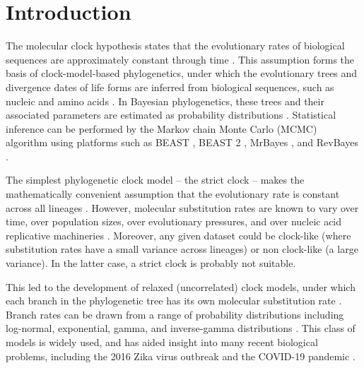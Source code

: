 \documentclass[10pt,letterpaper]{article}
\begin{document}
\linenumbers

\clearpage
\section*{Introduction}


The molecular clock hypothesis states that the evolutionary rates of biological sequences are approximately constant through time \cite{zuckerkandl1962molecular}.
This assumption forms the basis of clock-model-based phylogenetics, under which the evolutionary trees and divergence dates of life forms are inferred from biological sequences, such as nucleic and amino acids \cite{douzery2003local, drummond2006relaxed}.
In Bayesian phylogenetics, these trees and their associated parameters are estimated as probability distributions \cite{kuhner1995estimating, larget1999markov, mau1999bayesian}. 
Statistical inference can be performed by the Markov chain Monte Carlo (MCMC) algorithm \cite{metropolis53, hastings70} using platforms such as BEAST \cite{drummond2012bayesian}, BEAST 2 \cite{bouckaert2019beast}, MrBayes \cite{ronquist2012mrbayes}, and RevBayes \cite{hohna2016revbayes}.



The simplest phylogenetic clock model -- the strict clock -- makes the mathematically convenient assumption that the evolutionary rate is constant across all lineages \cite{zuckerkandl1965evolutionary, kuhner1995estimating, larget1999markov}.  %
However, molecular substitution rates are known to vary over time, over population sizes, over evolutionary pressures, and over nucleic acid replicative machineries \cite{gillespie1994causes, woolfit2009effective, loh2010optimization}.
Moreover, any given dataset could be clock-like (where substitution rates have a small variance across lineages) or non clock-like (a large variance). 
In the latter case, a strict clock is probably not suitable. 



This led to the development of relaxed (uncorrelated) clock models, under which each branch in the phylogenetic tree has its own molecular substitution rate  \cite{drummond2006relaxed}.
Branch rates can be drawn from a range of probability distributions including log-normal, exponential, gamma, and inverse-gamma distributions \cite{drummond2006relaxed, lepage2007general, li2012model}.
This class of models is widely used, and has aided insight into many recent biological problems, including the 2016 Zika virus outbreak \cite{faria2017establishment} and the COVID-19 pandemic \cite{giovanetti2020first}.
 
\end{document}
